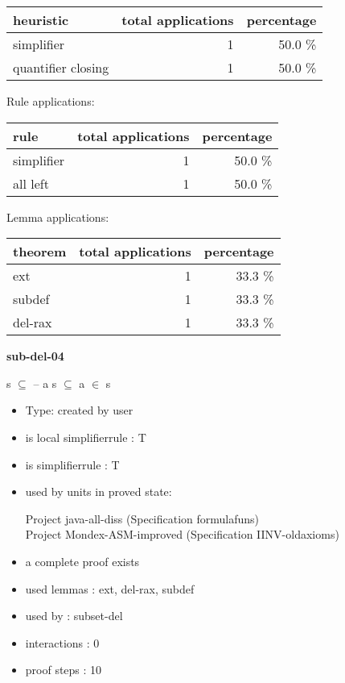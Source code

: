 \documentclass[a4paper]{article}
\begin{document}
\begin{supertabular}{l|r|r}
heuristic	& total applications & percentage \\ \hline
simplifier & 1 & 50.0 \% \\
quantifier closing & 1 & 50.0 \% \\

\end{supertabular}

Rule applications:

\begin{supertabular}{l|r|r}
rule	        & total applications & percentage \\ \hline
simplifier & 1 & 50.0 \% \\
all left & 1 & 50.0 \% \\

\end{supertabular}

Lemma applications:

\begin{supertabular}{l|r|r}
theorem	        & total applications & percentage \\ \hline
ext & 1 & 33.3 \% \\
subdef & 1 & 33.3 \% \\
del-rax & 1 & 33.3 \% \\

\end{supertabular}
\pagebreak

{\LARGE\bf sub-del-04}\label{lemma-sub-del-04}

\medskip

 \Fol s $\subseteq$  -- a \Equiv s $\subseteq$  \And \Not a $\in$ s

\begin{itemize}

\item Type: created by user

\item is local simplifierrule : T
\item is simplifierrule : T
\item used by units in proved state:

Project java-all-diss (Specification formulafuns) \\
Project Mondex-ASM-improved (Specification IINV-oldaxioms)
\item       a complete proof exists
\item       used lemmas  : ext, del-rax, subdef
\item       used by      : subset-del
\item       interactions : 0
\item       proof steps  : 10
\end{itemize}
\end{document}
